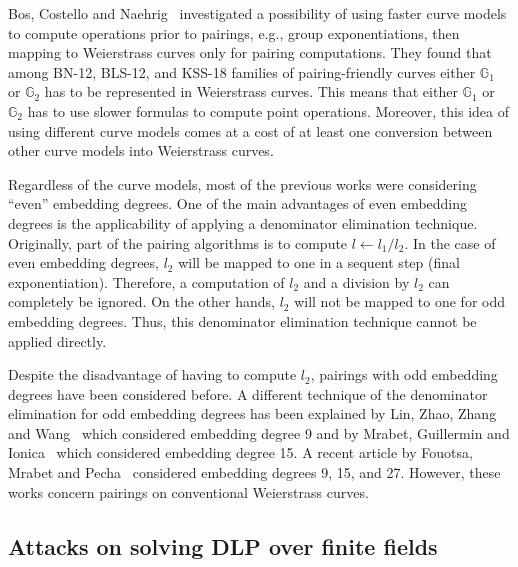Bos, Costello and Naehrig~\cite{2013/bos-pairing} investigated a possibility of
using faster curve models to compute operations prior to pairings, e.g., group exponentiations,
then mapping to Weierstrass curves only for pairing computations.
They found that among BN-12, BLS-12, and KSS-18 families of pairing-friendly curves
either $\mathbb{G}_1$ or $\mathbb{G}_2$ has to be represented in Weierstrass curves.
This means that either $\mathbb{G}_1$ or $\mathbb{G}_2$ has to use slower formulas to compute point operations.
Moreover, this idea of using different curve models comes at a cost of at least one conversion
between other curve models into Weierstrass curves.

Regardless of the curve models, most of the previous works were considering ``even'' embedding degrees.
One of the main advantages of even embedding degrees is the applicability of applying a denominator elimination technique.
Originally, part of the pairing algorithms is to compute $l \leftarrow l_1/l_2$.
In the case of even embedding degrees, $l_2$ will be mapped to one in a sequent step (final exponentiation).
Therefore, a computation of $l_2$ and a division by $l_2$ can completely be ignored.
On the other hands, $l_2$ will not be mapped to one for odd embedding degrees.
Thus, this denominator elimination technique cannot be applied directly.

Despite the disadvantage of having to compute $l_2$,
pairings with odd embedding degrees have been considered before.
A different technique of the denominator elimination for odd embedding degrees has been explained by
Lin, Zhao, Zhang and Wang~\cite{2008/lin} which considered embedding degree 9 and by
Mrabet, Guillermin and Ionica~\cite{2009/deg15} which considered embedding degree 15.
A recent article by Fouotsa, Mrabet and Pecha~\cite{2016/degodd} considered embedding degrees 9, 15, and 27.
However, these works concern pairings on conventional Weierstrass curves.

\subsection{Attacks on solving DLP over finite fields}

